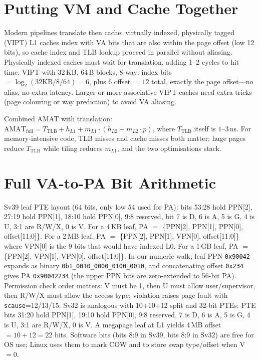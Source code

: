 \section{Putting VM and Cache Together}
Modern pipelines translate then cache: virtually indexed, physically tagged (VIPT) L1 caches index with VA bits that are also within the page offset (low 12 bits), so cache index and TLB lookup proceed in parallel without aliasing. Physically indexed caches must wait for translation, adding 1--2 cycles to hit time. VIPT with 32\,KB, 64\,B blocks, 8-way: index bits $= \log_2(32\text{KB}/8/64)=6$, plus 6 offset $=12$ total, exactly the page offset---no alias, no extra latency. Larger or more associative VIPT caches need extra tricks (page colouring or way prediction) to avoid VA aliasing.

Combined AMAT with translation: $\text{AMAT}_{\text{full}} = T_{\text{TLB}} + h_{L1} + m_{L1}\cdot(h_{L2}+m_{L2}\cdot p)$, where $T_{\text{TLB}}$ itself is $1$--$3$\,ns. For memory-intensive code, TLB misses and cache misses both matter; huge pages reduce $T_{\text{TLB}}$ while tiling reduces $m_{L1}$, and the two optimisations stack.

\section{Full VA-to-PA Bit Arithmetic}
Sv39 leaf PTE layout (64 bits, only low 54 used for PA):
bits 53:28 hold PPN[2], 27:19 hold PPN[1], 18:10 hold PPN[0], 9:8 reserved,
bit 7 is D, 6 is A, 5 is G, 4 is U, 3:1 are R/W/X, 0 is V.
For a 4\,KB leaf, PA $=$ \{PPN[2], PPN[1], PPN[0], offset[11:0]\}.
For a 2\,MB leaf, PA $=$ \{PPN[2], PPN[1], VPN[0], offset[11:0]\} where VPN[0] is the 9 bits that would have indexed L0.
For a 1\,GB leaf, PA $=$ \{PPN[2], VPN[1], VPN[0], offset[11:0]\}.
In our numeric walk, leaf PPN \texttt{0x90042} expands as binary
\texttt{0b1\_0010\_0000\_0100\_0010}, and concatenating offset \texttt{0x234}
gives PA \texttt{0x90042234} (the upper PPN bits are zero-extended to 56-bit PA).
Permission check order matters: V must be 1, then U must allow user/supervisor,
then R/W/X must allow the access type; violation raises page fault with \texttt{scause}=12/13/15.
Sv32 is analogous with 10+10+12 split and 32-bit PTEs:
PTE bits 31:20 hold PPN[1], 19:10 hold PPN[0], 9:8 reserved, 7 is D, 6 is A,
5 is G, 4 is U, 3:1 are R/W/X, 0 is V.
A megapage leaf at L1 yields 4\,MB offset $=10+12=22$ bits.
Software bits (bits 8:9 in Sv39, bits 8:9 in Sv32) are free for OS use;
Linux uses them to mark COW and to store swap type/offset when V$=0$.

